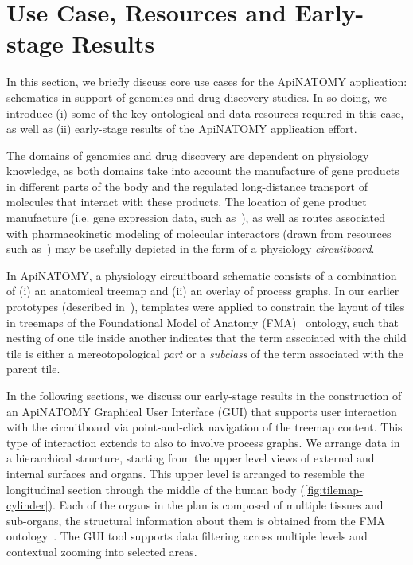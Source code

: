 \section{Use Case, Resources and Early-stage Results} \label{sect:motivation}            %

In this section, we briefly discuss core use cases for the ApiNATOMY application: schematics in support of genomics and drug discovery studies. In so doing, we introduce (i) some of the key ontological and data resources required in this case, as well as (ii) early-stage results of the ApiNATOMY application effort.

The domains of genomics and drug discovery are dependent on physiology knowledge, as both domains take into account the manufacture of gene products in different parts of the body and the regulated long-distance transport of molecules that interact with these products. The location of gene product manufacture (i.e. gene expression data, such as~\cite{EBI}), as well as routes associated with pharmacokinetic modeling of molecular interactors (drawn from resources such as~\cite{HMC+13}) may be usefully depicted in the form of a physiology \emph{circuitboard}.

In ApiNATOMY, a physiology circuitboard schematic consists of a combination of (i) an anatomical treemap and (ii) an overlay of process graphs. In our earlier prototypes (described in~\cite{BGS12,KBK14}), templates were applied to constrain the layout of tiles in treemaps of the Foundational Model of Anatomy (FMA)~\cite{RM03} ontology, such that nesting of one tile inside another indicates that the term asscoiated with the child tile is either a mereotopological \emph{part} or a \emph{subclass} of the term associated with the parent tile. 

In the following sections, we discuss our early-stage results in the construction of an ApiNATOMY Graphical User Interface (GUI) that supports user interaction with the circuitboard via point-and-click navigation of the treemap content. This type of interaction extends to also to involve process graphs. We arrange data in a hierarchical structure, starting from the upper level views of external and internal surfaces and organs. This upper level is arranged to resemble the longitudinal section through the middle of the human body (\cref{fig:tilemap-cylinder}).
Each of the organs in the plan is composed of multiple tissues and sub-organs, the structural information about them is obtained from the FMA ontology~\cite{RM03}. The GUI tool supports data filtering across multiple levels and contextual zooming into selected areas.


